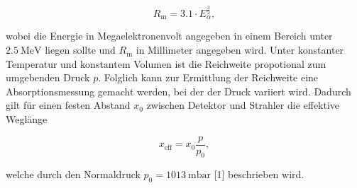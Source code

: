 \begin{equation}
R_\text{m}= \num{3.1}\cdot E_\alpha^\frac{3}{2},
\end{equation}

wobei die Energie in Megaelektronenvolt angegeben in einem Bereich unter $\SI{2.5}{\mega\eV}$ liegen sollte und 
$R_\text{m}$ in Millimeter angegeben wird. Unter konstanter Temperatur und konstantem Volumen ist die Reichweite 
propotional zum umgebenden Druck $p$. Folglich kann zur Ermittlung der Reichweite eine Absorptionsmessung 
gemacht werden, bei der der Druck variiert wird. Dadurch gilt für einen festen Abstand $x_0$ zwischen Detektor 
und Strahler die effektive Weglänge 

\begin{equation}
x_\text{eff} = x_0 \frac{p}{p_0},
\label{eqn:Weglaenge}
\end{equation}

welche durch den Normaldruck $p_0 = \SI{1013}{\milli\bar}$ [1] beschrieben wird. 